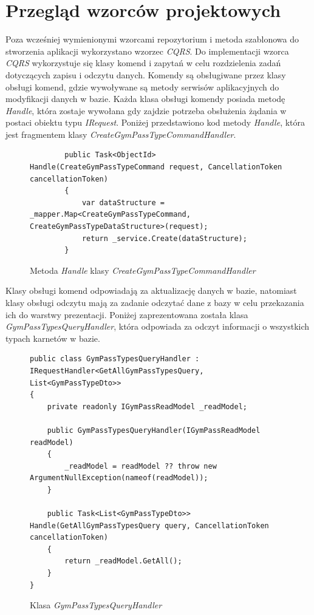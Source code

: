 \documentclass[a4paper,twoside,12pt]{book}
\begin{document}
\section{Przegląd wzorców projektowych}
Poza wcześniej wymienionymi wzorcami repozytorium i metoda szablonowa do stworzenia aplikacji wykorzystano wzorzec \textit{CQRS}. Do implementacji wzorca \textit{CQRS} wykorzystuje się klasy komend i zapytań w celu rozdzielenia zadań dotyczących zapisu i odczytu danych. Komendy są obsługiwane przez klasy obsługi komend, gdzie wywoływane są metody serwisów aplikacyjnych do modyfikacji danych w bazie. Każda klasa obsługi komendy posiada metodę \textit{Handle}, która zostaje wywołana gdy zajdzie potrzeba obsłużenia żądania w postaci obiektu typu \textit{IRequest}. Poniżej przedstawiono kod metody \textit{Handle}, która jest fragmentem klasy \textit{CreateGymPassTypeCommandHandler}.
\begin{figure} [H]
	\centering
	\begin{lstlisting}			
        public Task<ObjectId> Handle(CreateGymPassTypeCommand request, CancellationToken cancellationToken)
		{
			var dataStructure = _mapper.Map<CreateGymPassTypeCommand, CreateGymPassTypeDataStructure>(request);
			return _service.Create(dataStructure);
		}
	\end{lstlisting}
	\caption{Metoda \textit{Handle} klasy \textit{CreateGymPassTypeCommandHandler}}
	\label{fig:commandHandler}
\end{figure}
Klasy obsługi komend odpowiadają za aktualizację danych w bazie, natomiast klasy obsługi odczytu mają za zadanie odczytać dane z bazy w celu przekazania ich do warstwy prezentacji. Poniżej zaprezentowana została klasa \textit{GymPassTypesQueryHandler}, która odpowiada za odczyt informacji o wszystkich typach karnetów w bazie.
\begin{figure} [H]
	\centering
	\begin{lstlisting}
public class GymPassTypesQueryHandler : IRequestHandler<GetAllGymPassTypesQuery, List<GymPassTypeDto>>
{
	private readonly IGymPassReadModel _readModel;

	public GymPassTypesQueryHandler(IGymPassReadModel readModel)
	{
		_readModel = readModel ?? throw new ArgumentNullException(nameof(readModel));
	}

	public Task<List<GymPassTypeDto>> Handle(GetAllGymPassTypesQuery query, CancellationToken cancellationToken)
	{
		return _readModel.GetAll();
	}
}
	\end{lstlisting}
	\caption{Klasa \textit{GymPassTypesQueryHandler}}
	\label{fig:queryHangler}
\end{figure}
\end{document}
